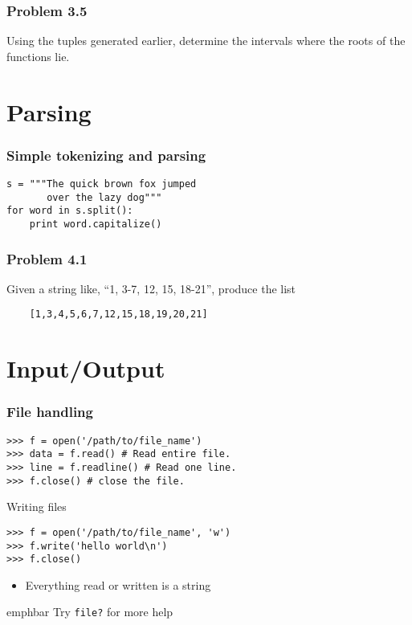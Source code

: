 \documentclass[14pt,compress]{beamer}
\newcommand{\emphbar}[1]
{\begin{beamercolorbox}[rounded=true]{emphbar} 
      {#1}
 \end{beamercolorbox}
}
\newcounter{time}
\newcommand{\inctime}[1]{\addtocounter{time}{#1}{\tiny \thetime\ m}}
\newcommand{\typ}[1]{\texttt{#1}}
\begin{document}
\begin{frame}[fragile]
  \frametitle{Problem 3.5}

  Using the tuples generated earlier, determine the intervals where the roots of the functions lie.

  \inctime{15}
\end{frame}


\section{Parsing}

\begin{frame}[fragile]
  \frametitle{Simple tokenizing and parsing}
  \begin{lstlisting}
s = """The quick brown fox jumped
       over the lazy dog"""
for word in s.split():
    print word.capitalize()
  \end{lstlisting}
\end{frame}

\begin{frame}[fragile]
  \frametitle{Problem 4.1}
  Given a string like, ``1, 3-7, 12, 15, 18-21'', produce the list \\
  \begin{lstlisting}
    [1,3,4,5,6,7,12,15,18,19,20,21]
  \end{lstlisting}
\end{frame}

\section{Input/Output}

\begin{frame}[fragile]
  \frametitle{File handling}
\begin{lstlisting}
>>> f = open('/path/to/file_name')
>>> data = f.read() # Read entire file.
>>> line = f.readline() # Read one line.
>>> f.close() # close the file.
\end{lstlisting}
Writing files
\begin{lstlisting}
>>> f = open('/path/to/file_name', 'w')
>>> f.write('hello world\n')
>>> f.close()
\end{lstlisting}
\begin{itemize}
    \item Everything read or written is a string
\end{itemize}
\emphbar{Try \typ{file?} for more help}
\end{frame}
\end{document}
